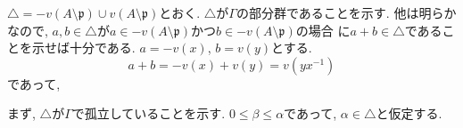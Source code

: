 \documentclass[dvipdfmx]{jsarticle}
\begin{document}
    \begin{problem}
        $\triangle = -v(A \setminus \mathfrak{p}) \cup v(A \setminus \mathfrak{p})$とおく.
        $\triangle$が$\Gamma$の部分群であることを示す.
        他は明らかなので, $a, b \in \triangle$が$a \in -v(A \setminus \mathfrak{p})$かつ$b \in -v(A \setminus \mathfrak{p})$の場合
        に$a + b \in \triangle$であることを示せば十分である.
        $a = -v(x)$, $b = v(y)$とする.
        \[
            a + b = -v(x) + v(y) = v(yx^{-1})
        \]
        であって,

        まず, $\triangle$が$\Gamma$で孤立していることを示す.
        $0 \leq \beta \leq \alpha$であって, $\alpha \in \triangle$と仮定する.

    \end{problem}
\end{document}
